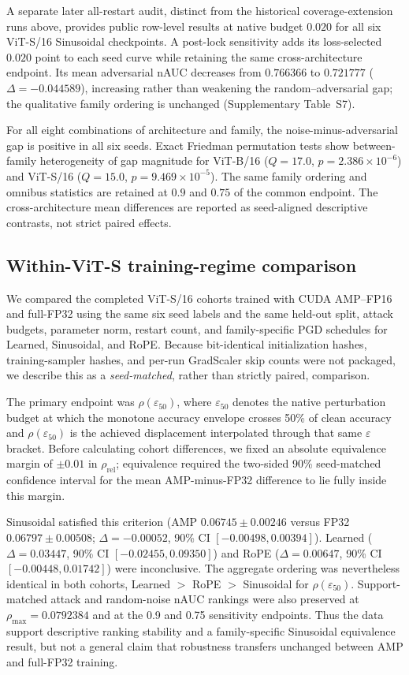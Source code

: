 \documentclass[preprint,12pt,authoryear]{elsarticle}
\begin{document}
A separate later all-restart audit, distinct from the historical
coverage-extension runs above, provides public row-level results at native
budget $0.020$ for all six ViT-S/16 Sinusoidal checkpoints. A post-lock
sensitivity adds its loss-selected $0.020$ point to each seed curve while
retaining the same cross-architecture endpoint. Its mean adversarial nAUC decreases
from $0.766366$ to $0.721777$ ($\Delta=-0.044589$), increasing rather than
weakening the random--adversarial gap; the qualitative family ordering is
unchanged (Supplementary Table~S7).

For all eight combinations of architecture and family, the
noise-minus-adversarial gap is positive in all six seeds. Exact Friedman permutation
tests show between-family heterogeneity of gap magnitude for ViT-B/16
($Q=17.0$, $p=2.386\times10^{-6}$) and ViT-S/16
($Q=15.0$, $p=9.469\times10^{-5}$). The same family ordering and omnibus
statistics are retained at $0.9$ and $0.75$ of the common endpoint. The
cross-architecture mean differences are reported as seed-aligned
descriptive contrasts, not strict paired effects.

\subsection{Within-ViT-S training-regime comparison}
\label{sec:within-vits-training-regime}
We compared the completed ViT-S/16 cohorts trained with CUDA AMP--FP16 and
full-FP32 using the same six seed labels and the same held-out split, attack
budgets, parameter norm, restart count, and family-specific PGD schedules for
Learned, Sinusoidal, and RoPE. Because bit-identical initialization hashes,
training-sampler hashes, and per-run GradScaler skip counts were not packaged,
we describe this as a \emph{seed-matched}, rather than strictly paired,
comparison.

The primary endpoint was $\rho(\varepsilon_{50})$, where $\varepsilon_{50}$
denotes the native perturbation budget at which the monotone accuracy envelope
crosses 50\% of clean accuracy and $\rho(\varepsilon_{50})$ is the achieved
displacement interpolated through that same $\varepsilon$ bracket. Before calculating cohort differences,
we fixed an absolute equivalence margin of $\pm0.01$ in $\rho_{\mathrm{rel}}$;
equivalence required the two-sided 90\% seed-matched confidence interval for
the mean AMP-minus-FP32 difference to lie fully inside this margin.

Sinusoidal satisfied this criterion (AMP $0.06745\pm0.00246$ versus FP32
$0.06797\pm0.00508$; $\Delta=-0.00052$, 90\% CI
$[-0.00498,0.00394]$). Learned ($\Delta=0.03447$, 90\% CI
$[-0.02455,0.09350]$) and RoPE ($\Delta=0.00647$, 90\% CI
$[-0.00448,0.01742]$) were inconclusive. The aggregate ordering was nevertheless
identical in both cohorts, Learned $>$ RoPE $>$ Sinusoidal for
$\rho(\varepsilon_{50})$. Support-matched attack and random-noise nAUC rankings
were also preserved at $\rho_{\max}=0.0792384$ and at the 0.9 and 0.75
sensitivity endpoints. Thus the data support descriptive ranking stability and
a family-specific Sinusoidal equivalence result, but not a general claim that
robustness transfers unchanged between AMP and full-FP32 training.
\end{document}
